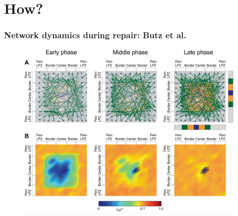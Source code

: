 \section{How?}
\begin{frame}[c]
  \frametitle{Network dynamics during repair: Butz et al.}
  \begin{figure}[h]
    \centering
    \includegraphics[width=0.8\linewidth]{99_images/butz3.png}
  \end{figure}
\end{frame}

